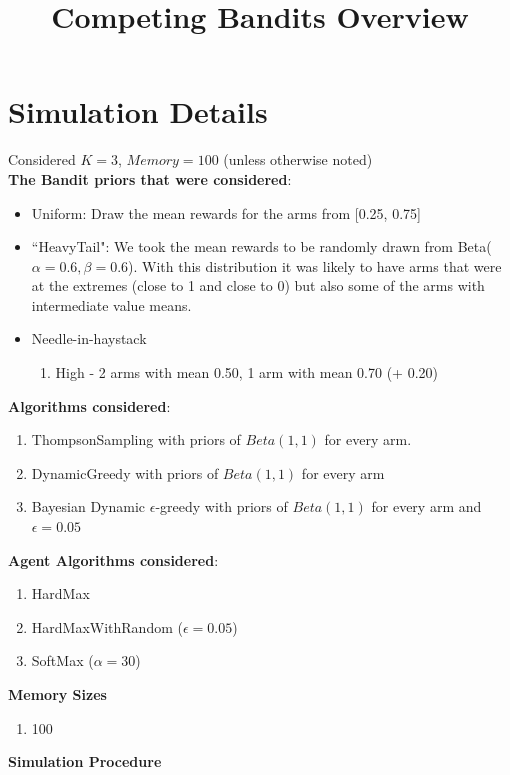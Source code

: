 \documentclass[11pt,letterpaper]{article}
\begin{document}
 

\title{Competing Bandits Overview}
\maketitle

\section*{Simulation Details}

Considered $K = 3$, $Memory = 100$ (unless otherwise noted) \\
\textbf{The Bandit priors that were considered}:
\begin{itemize}
\item Uniform: Draw the mean rewards for the arms from [0.25, 0.75]
\item ``HeavyTail": We took the mean rewards to be randomly drawn from Beta($\alpha=0.6,\beta=0.6$). With this distribution it was likely to have arms that were at the extremes (close to 1 and close to 0) but also some of the arms with intermediate value means.
\item Needle-in-haystack
\begin{enumerate}
\item High - 2 arms with mean 0.50, 1 arm with mean 0.70 (+ 0.20)
\end{enumerate}
\end{itemize}
\textbf{Algorithms considered}:
\begin{enumerate}
\item ThompsonSampling with priors of $Beta(1, 1)$ for every arm.
\item DynamicGreedy with priors of $Beta(1, 1)$ for every arm
\item Bayesian Dynamic $\epsilon$-greedy with priors of $Beta(1, 1)$ for every arm and $\epsilon=0.05$
\end{enumerate}
\textbf{Agent Algorithms considered}:
\begin{enumerate}
\item HardMax
\item HardMaxWithRandom ($\epsilon = 0.05$)
\item SoftMax ($\alpha = 30$)
\end{enumerate}
\textbf{Memory Sizes}
\begin{enumerate}
\item 100
\end{enumerate}
\pagebreak
\textbf{Simulation Procedure}
\end{document}
